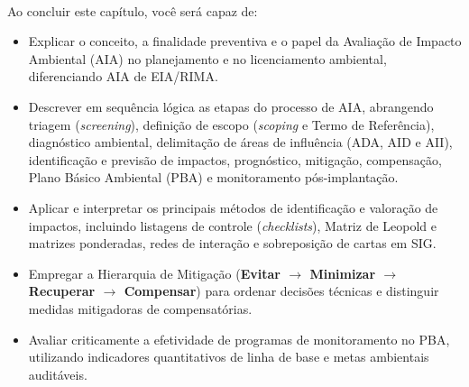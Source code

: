 \noindent\tagEmenta\ \ \tagPratica
\par\vspace{6pt}

\begin{capObjetivos}
  Ao concluir este capítulo, você será capaz de:
  \begin{itemize}[leftmargin=1.5em, itemsep=2.5pt]
    \item Explicar o conceito, a finalidade preventiva e o papel da Avaliação de Impacto Ambiental (AIA) no planejamento e no licenciamento ambiental, diferenciando AIA de EIA/RIMA.
    \item Descrever em sequência lógica as etapas do processo de AIA, abrangendo triagem (\textit{screening}), definição de escopo (\textit{scoping} e Termo de Referência), diagnóstico ambiental, delimitação de áreas de influência (ADA, AID e AII), identificação e previsão de impactos, prognóstico, mitigação, compensação, Plano Básico Ambiental (PBA) e monitoramento pós-implantação.
    \item Aplicar e interpretar os principais métodos de identificação e valoração de impactos, incluindo listagens de controle (\textit{checklists}), Matriz de Leopold e matrizes ponderadas, redes de interação e sobreposição de cartas em SIG.
    \item Empregar a Hierarquia de Mitigação (\textbf{Evitar $\to$ Minimizar $\to$ Recuperar $\to$ Compensar}) para ordenar decisões técnicas e distinguir medidas mitigadoras de compensatórias.
    \item Avaliar criticamente a efetividade de programas de monitoramento no PBA, utilizando indicadores quantitativos de linha de base e metas ambientais auditáveis.
  \end{itemize}
\end{capObjetivos}

